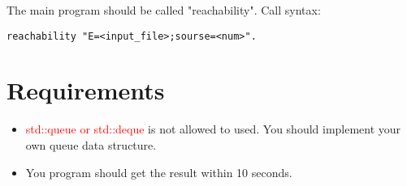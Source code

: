 \documentclass[times,11pt,verbatim,js-singlespace]{article}  %
\begin{document}
The main program should be called "reachability".
Call syntax:
\begin{verbatim}
reachability "E=<input_file>;sourse=<num>".
\end{verbatim}

\section{Requirements}
\begin{itemize}
\item \textcolor{red}{std::queue or std::deque} is not allowed to used. You should implement your own queue data structure.
\item You program should get the result within 10 seconds.
\end{itemize}
\end{document}
